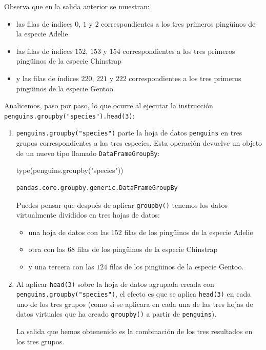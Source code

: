 \documentclass[
  a4paper,
  noprof,
  12pt,
  notoc,
  nosols,
  nobib]{mnye}
\newenvironment{Shaded}{\begin{snugshade}}{\end{snugshade}}
\newcommand{\BuiltInTok}[1]{\textcolor[rgb]{0.00,0.23,0.31}{#1}}
\newcommand{\NormalTok}[1]{\textcolor[rgb]{0.00,0.23,0.31}{#1}}
\newcommand{\StringTok}[1]{\textcolor[rgb]{0.13,0.47,0.30}{#1}}
\providecommand{\tightlist}{%
  \setlength{\itemsep}{0pt}\setlength{\parskip}{0pt}}\usepackage{longtable,booktabs,array}
\theoremstyle{definition}
\theoremstyle{remark}
\begin{document}
Observa que en la salida anterior se muestran:

\begin{itemize}
\tightlist
\item
  las filas de índices \(0\), \(1\) y \(2\) correspondientes a los tres
  primeros pingüinos de la especie Adelie
\item
  las filas de índices \(152\), \(153\) y \(154\) correspondientes a los
  tres primeros pingüinos de la especie Chinstrap
\item
  y las filas de índices \(220\), \(221\) y \(222\) correspondientes a
  los tres primeros pingüinos de la especie Gentoo.
\end{itemize}

Analicemos, paso por paso, lo que ocurre al ejecutar la instrucción
\texttt{penguins.groupby("species").head(3)}:

\begin{enumerate}
\def\labelenumi{\arabic{enumi}.}
\item
  \texttt{penguins.groupby("species")} parte la hoja de datos
  \texttt{penguins} en tres grupos correspondientes a las tres especies.
  Esta operación devuelve un objeto de un nuevo tipo llamado
  \texttt{DataFrameGroupBy}:

\begin{Shaded}
\begin{Highlighting}[]
\BuiltInTok{type}\NormalTok{(penguins.groupby(}\StringTok{"species"}\NormalTok{))}
\end{Highlighting}
\end{Shaded}

\begin{verbatim}
pandas.core.groupby.generic.DataFrameGroupBy
\end{verbatim}

  Puedes pensar que después de aplicar \texttt{groupby()} tenemos los
  datos virtualmente divididos en tres hojas de datos:

  \begin{itemize}
  \tightlist
  \item
    una hoja de datos con las \(152\) filas de los pingüinos de la
    especie Adelie
  \item
    otra con las \(68\) filas de los pingüinos de la especie Chinstrap
  \item
    y una tercera con las \(124\) filas de los pingüinos de la especie
    Gentoo.
  \end{itemize}
\item
  Al aplicar \texttt{head(3)} sobre la hoja de datos agrupada creada con
  \texttt{penguins.groupby("species")}, el efecto es que se aplica
  \texttt{head(3)} en cada uno de los tres grupos (como si se aplicara
  en cada una de las tres hojas de datos virtuales que ha creado
  \texttt{groupby()} a partir de \texttt{penguins}).

  La salida que hemos obtenenido es la combinación de los tres
  resultados en los tres grupos.
\end{enumerate}
\end{document}
